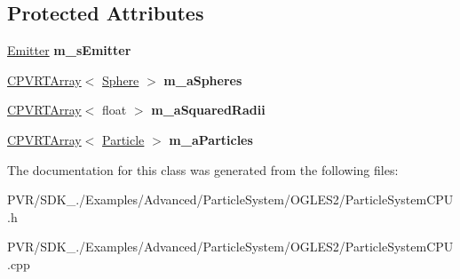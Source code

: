 \subsection*{Protected Attributes}
\begin{DoxyCompactItemize}
\item 
\hypertarget{class_particle_system_c_p_u_aae583ab6f697d4c90e24ff23725e4c49}{\hyperlink{struct_emitter}{Emitter} {\bfseries m\+\_\+s\+Emitter}}\label{class_particle_system_c_p_u_aae583ab6f697d4c90e24ff23725e4c49}

\item 
\hypertarget{class_particle_system_c_p_u_a9b6e409ffd209b0958b4f9c0028a71e1}{\hyperlink{class_c_p_v_r_t_array}{C\+P\+V\+R\+T\+Array}$<$ \hyperlink{class_sphere}{Sphere} $>$ {\bfseries m\+\_\+a\+Spheres}}\label{class_particle_system_c_p_u_a9b6e409ffd209b0958b4f9c0028a71e1}

\item 
\hypertarget{class_particle_system_c_p_u_a6f42221d823d85905a0530f1ec7f70cc}{\hyperlink{class_c_p_v_r_t_array}{C\+P\+V\+R\+T\+Array}$<$ float $>$ {\bfseries m\+\_\+a\+Squared\+Radii}}\label{class_particle_system_c_p_u_a6f42221d823d85905a0530f1ec7f70cc}

\item 
\hypertarget{class_particle_system_c_p_u_a56d0b3f2d2457110afc2762c11ec5729}{\hyperlink{class_c_p_v_r_t_array}{C\+P\+V\+R\+T\+Array}$<$ \hyperlink{struct_particle}{Particle} $>$ {\bfseries m\+\_\+a\+Particles}}\label{class_particle_system_c_p_u_a56d0b3f2d2457110afc2762c11ec5729}

\end{DoxyCompactItemize}


The documentation for this class was generated from the following files\+:\begin{DoxyCompactItemize}
\item 
P\+V\+R/\+S\+D\+K\+\_./\+Examples/\+Advanced/\+Particle\+System/\+O\+G\+L\+E\+S2/Particle\+System\+C\+P\+U.\+h\item 
P\+V\+R/\+S\+D\+K\+\_./\+Examples/\+Advanced/\+Particle\+System/\+O\+G\+L\+E\+S2/Particle\+System\+C\+P\+U.\+cpp\end{DoxyCompactItemize}
